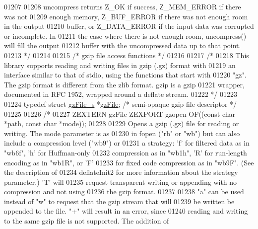 \begin{DoxyCode}
01207 \textcolor{comment}{}
01208 \textcolor{comment}{     uncompress returns Z\_OK if success, Z\_MEM\_ERROR if there was not}
01209 \textcolor{comment}{   enough memory, Z\_BUF\_ERROR if there was not enough room in the output}
01210 \textcolor{comment}{   buffer, or Z\_DATA\_ERROR if the input data was corrupted or incomplete.  In}
01211 \textcolor{comment}{   the case where there is not enough room, uncompress() will fill the output}
01212 \textcolor{comment}{   buffer with the uncompressed data up to that point.}
01213 \textcolor{comment}{*/}
01214 
01215                         \textcolor{comment}{/* gzip file access functions */}
01216 
01217 \textcolor{comment}{/*}
01218 \textcolor{comment}{     This library supports reading and writing files in gzip (.gz) format with}
01219 \textcolor{comment}{   an interface similar to that of stdio, using the functions that start with}
01220 \textcolor{comment}{   "gz".  The gzip format is different from the zlib format.  gzip is a gzip}
01221 \textcolor{comment}{   wrapper, documented in RFC 1952, wrapped around a deflate stream.}
01222 \textcolor{comment}{*/}
01223 
01224 \textcolor{keyword}{typedef} \textcolor{keyword}{struct }\hyperlink{structgz_file__s}{gzFile\_s} *\hyperlink{structgz_file__s}{gzFile};    \textcolor{comment}{/* semi-opaque gzip file descriptor */}
01225 
01226 \textcolor{comment}{/*}
01227 \textcolor{comment}{ZEXTERN gzFile ZEXPORT gzopen OF((const char *path, const char *mode));}
01228 \textcolor{comment}{}
01229 \textcolor{comment}{     Opens a gzip (.gz) file for reading or writing.  The mode parameter is as}
01230 \textcolor{comment}{   in fopen ("rb" or "wb") but can also include a compression level ("wb9") or}
01231 \textcolor{comment}{   a strategy: 'f' for filtered data as in "wb6f", 'h' for Huffman-only}
01232 \textcolor{comment}{   compression as in "wb1h", 'R' for run-length encoding as in "wb1R", or 'F'}
01233 \textcolor{comment}{   for fixed code compression as in "wb9F".  (See the description of}
01234 \textcolor{comment}{   deflateInit2 for more information about the strategy parameter.)  'T' will}
01235 \textcolor{comment}{   request transparent writing or appending with no compression and not using}
01236 \textcolor{comment}{   the gzip format.}
01237 \textcolor{comment}{}
01238 \textcolor{comment}{     "a" can be used instead of "w" to request that the gzip stream that will}
01239 \textcolor{comment}{   be written be appended to the file.  "+" will result in an error, since}
01240 \textcolor{comment}{   reading and writing to the same gzip file is not supported.  The addition of}

\end{DoxyCode}

